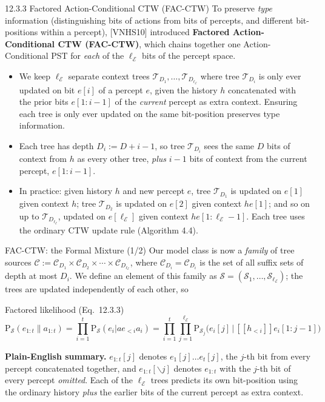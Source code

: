 \documentclass[aspectratio=169,10pt]{beamer}
\newcommand{\Ecal}{\mathcal{E}}
\newcommand{\Scal}{\mathcal{S}}
\newcommand{\Ccal}{\mathcal{C}}
\newcommand{\Tcal}{\mathcal{T}}
\newcommand{\CDi}[1]{\mathcal{C}_{D_{#1}}}
\begin{document}
\begin{frame}{12.3.3 Factored Action-Conditional CTW (FAC-CTW)}
To preserve \emph{type} information (distinguishing bits of actions from bits of
percepts, and different bit-positions within a percept), [VNHS10] introduced
\textbf{Factored Action-Conditional CTW (FAC-CTW)}, which chains together one
Action-Conditional PST for \emph{each} of the $\ell_\Ecal$ bits of the percept space.
\begin{itemize}
\item We keep $\ell_\Ecal$ separate context trees $\Tcal_{D_1},\ldots,\Tcal_{D_{\ell_\Ecal}}$
where tree $\Tcal_{D_i}$ is only ever updated on bit $e[i]$ of a percept $e$, given the
history $h$ concatenated with the prior bits $e[1{:}i{-}1]$ of the \emph{current} percept
as extra context. Ensuring each tree is only ever updated on the same bit-position
preserves type information.
\item Each tree has depth $D_i:=D+i-1$, so tree $\Tcal_{D_i}$ sees the same $D$ bits of
context from $h$ as every other tree, \emph{plus} $i-1$ bits of context from the current
percept, $e[1{:}i{-}1]$.
\item In practice: given history $h$ and new percept $e$, tree $\Tcal_{D_1}$ is updated on
$e[1]$ given context $h$; tree $\Tcal_{D_2}$ is updated on $e[2]$ given context $he[1]$;
and so on up to $\Tcal_{D_{\ell_\Ecal}}$, updated on $e[\ell_\Ecal]$ given context
$he[1{:}\ell_\Ecal{-}1]$. Each tree uses the ordinary CTW update rule (Algorithm 4.4).
\end{itemize}
\end{frame}

\begin{frame}{FAC-CTW: the Formal Mixture (1/2)}
\small
Our model class is now a \emph{family} of tree sources
$\Ccal:=\CDi{1}\times\CDi{2}\times\cdots\times\CDi{\ell_\Ecal}$, where $\CDi{i}=\mathcal
C_{D_i}$ is the set of all suffix sets of depth at most $D_i$. We define an element of this family as
$\Scal=(\Scal_1,\ldots,\Scal_{\ell_\Ecal})$; the trees are updated independently of each
other, so
\begin{block}{Factored likelihood (Eq.\ 12.3.3)}
$$\mathrm{P}_\Scal(e_{1:t}\|a_{1:t}) = \prod_{i=1}^t \mathrm{P}_\Scal(e_i|ae_{<i}a_i) =
\prod_{i=1}^t\prod_{j=1}^{\ell_\Ecal} \mathrm{P}_{\Scal_j}\big(e_i[j]\,\big|\,
[\![h_{<i}]\!]e_i[1{:}j{-}1]\big)$$
\end{block}
\textbf{Plain-English summary.} $e_{1:t}[j]$ denotes $e_1[j]\ldots e_t[j]$, the $j$-th bit
from every percept concatenated together, and $e_{1:t}[\backslash j]$ denotes $e_{1:t}$
with the $j$-th bit of every percept \emph{omitted}. Each of the $\ell_\Ecal$ trees
predicts its own bit-position using the ordinary history \emph{plus} the earlier bits of
the current percept as extra context.
\end{frame}
\end{document}
